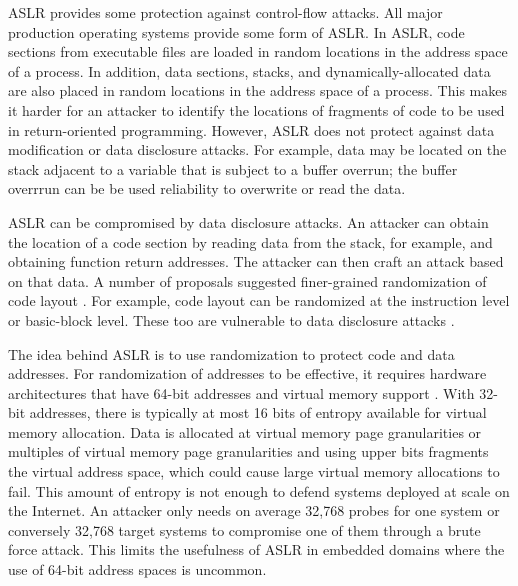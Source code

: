 ASLR \cite{PaX2003,WikipediaASLR} provides some protection against 
control-flow attacks.   All major production operating systems provide
some form of ASLR. In ASLR, code
sections from executable files are loaded in random locations in the
address space of a process.  In addition, data sections, stacks, and
dynamically-allocated data are also placed in random locations in the address
space of a process. This makes it harder for an attacker to identify the locations of fragments of code to be used in return-oriented programming.  However, ASLR does
not protect against data modification or data disclosure attacks. For example, data 
may be located on the stack adjacent to a
variable that is subject to a buffer overrun; the buffer overrrun can be
be used reliability to overwrite or read the data.   

ASLR can be compromised by data disclosure attacks.  An attacker can obtain the
location of a code section by reading data from the stack, for example, and obtaining function return addresses.  The attacker can then craft an attack based on that data. 
A number of proposals suggested finer-grained  randomization of code layout
\cite{Bhatkar2005, Hiser2012, Kil2006, Pappas2012,Wartell2012}.
For example, code layout can be randomized at the instruction level or
basic-block level. These too are vulnerable to 
data disclosure attacks \cite{Snow2013}.

The idea behind ASLR is to use randomization to protect
code and data addresses.  For randomization of addresses to be effective, 
it requires hardware  architectures that have 64-bit addresses and 
virtual memory support \cite{Shacham2004}.  With 32-bit addresses, 
there is typically  at most 16 bits of entropy available for
virtual memory allocation.  Data is allocated at virtual memory
page granularities or multiples of virtual memory page granularities
and using upper bits fragments the virtual address space, which
could cause large virtual memory allocations to fail.  This
amount of entropy is not enough to defend systems deployed at scale on
the Internet.  An attacker only needs on average 32,768 probes for one system or 
conversely 32,768 target systems to compromise one of them through a
brute force attack.
This limits the usefulness of ASLR in embedded domains where 
the use of 64-bit address spaces is uncommon.  

